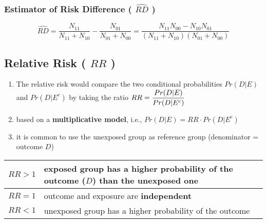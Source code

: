 \subsubsection{Estimator of Risk Difference ( $\hat{RD}$ ) \cite{ism-1}}\label{Estimator of Risk Difference}

\[
    \hat{RD} 
    = \dfrac{N_{11}}{N_{11} + N_{10}} - \dfrac{N_{01}}{N_{01} + N_{00}}
    = \dfrac{N_{11}N_{00} - N_{10}N_{01}}{(N_{11} + N_{10})(N_{01} + N_{00})}
\]


\subsection{Relative Risk ( $RR$ ) \cite{ism-1}}\label{Relative Risk}

\begin{enumerate}[itemsep=0.2cm]
    \item The relative risk would compare the two conditional probabilities $Pr (D|E)$ and $Pr (D|E^c)$ by taking the ratio 
    $   
        \hfill
        RR = \dfrac{Pr (D|E)}{Pr (D|E^c)} 
        \hfill
    $

    \item based on a \textbf{multiplicative model}, i.e., $Pr (D|E) = RR \cdot Pr (D|E^c)$

    \item it is common to use the unexposed group as reference group (denominator = outcome $D$)

\end{enumerate}


\begin{customTableWrapper}{1.5}
\begin{table}[H]
    \centering
    \begin{tabular}{|l|p{9cm}|}
        \hline

        $RR > 1$ & exposed group has a higher probability of the outcome ($D$) than the unexposed one \\
        \hline

        $RR = 1$ & outcome and exposure are \textbf{independent} \\
        \hline

        $RR < 1$ & unexposed group has a higher probability of the outcome \\
        \hline

    \end{tabular}
\end{table}
\end{customTableWrapper}

